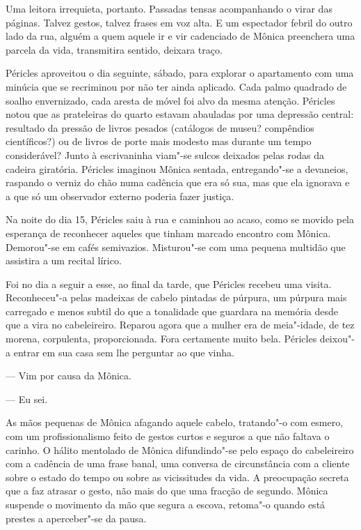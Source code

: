 Uma leitora irrequieta, portanto. Passadas tensas acompanhando o virar
das páginas. Talvez gestos, talvez frases em voz alta. E um espectador
febril do outro lado da rua, alguém a quem aquele ir e vir cadenciado de
Mônica preenchera uma parcela da vida, transmitira sentido, deixara
traço.

Péricles aproveitou o dia seguinte, sábado, para explorar o apartamento
com uma minúcia que se recriminou por não ter ainda aplicado. Cada palmo
quadrado de soalho envernizado, cada aresta de móvel foi alvo da mesma
atenção. Péricles notou que as prateleiras do quarto estavam abauladas
por uma depressão central: resultado da pressão de livros pesados
(catálogos de museu? compêndios científicos?) ou de livros de porte
mais modesto mas durante um tempo considerável? Junto à escrivaninha
viam"-se sulcos deixados pelas rodas da cadeira giratória. Péricles
imaginou Mônica sentada, entregando"-se a devaneios, raspando o verniz do
chão numa cadência que era só sua, mas que ela ignorava e a que só um
observador externo poderia fazer justiça.

Na noite do dia 15, Péricles saiu à rua e caminhou ao acaso, como se
movido pela esperança de reconhecer aqueles que tinham marcado encontro com Mônica. Demorou"-se em cafés
semivazios. Misturou"-se com uma pequena multidão que assistira a um
recital lírico.

Foi no dia a seguir a esse, ao final da tarde, que Péricles recebeu uma
visita. Reconheceu"-a pelas madeixas de cabelo pintadas de púrpura, um
púrpura mais carregado e menos subtil do que a tonalidade que guardara
na memória desde que a vira no cabeleireiro. Reparou agora que a mulher
era de meia"-idade, de tez morena, corpulenta, proporcionada. Fora
certamente muito bela. Péricles deixou"-a entrar em sua casa sem lhe
perguntar ao que vinha.

--- Vim por causa da Mônica.

--- Eu sei.


As mãos pequenas de Mônica afagando aquele cabelo, tratando"-o com
esmero, com um profissionalismo feito de gestos curtos e seguros a que
não faltava o carinho. O hálito mentolado de Mônica difundindo"-se pelo
espaço do cabeleireiro com a cadência de uma frase banal, uma conversa
de circunstância com a cliente sobre o estado do tempo ou sobre as
vicissitudes da vida. A preocupação secreta que a faz atrasar o gesto,
não mais do que uma fracção de segundo. Mônica suspende o movimento da
mão que segura a escova, retoma"-o quando está prestes a aperceber"-se da
pausa.

